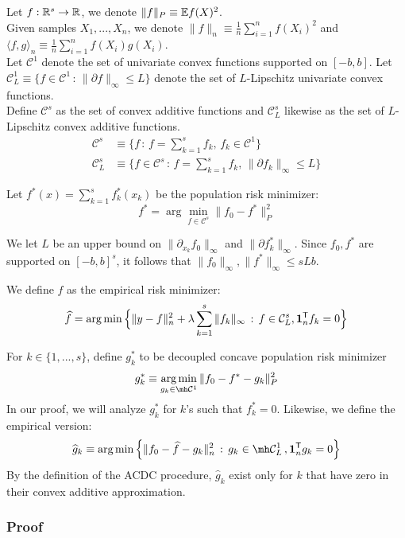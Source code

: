 Let $f : \mathbb{R}^s \rightarrow {\mathbb R}$, we denote $\| f \|_P \equiv {\mathbb E} f(X)^2$. \\
Given samples $X_1,...,X_n$, we denote $\| f \|_n \equiv \frac{1}{n} \sum_{i=1}^n f(X_i)^2$ and $\langle f, g \rangle_n \equiv \frac{1}{n} \sum_{i=1}^n f(X_i) g(X_i)$. \\

Let $\mathcal{C}^1$ denote the set of univariate convex functions supported on $[-b,b]$. Let $\mathcal{C}^1_L \equiv \{ f \in \mathcal{C}^1 \,:\, \| \partial f \|_\infty \leq L \}$ denote the set of $L$-Lipschitz univariate convex functions. \\

Define $\mathcal{C}^s$ as the set of convex additive functions and $\mathcal{C}^s_L$ likewise as the set of $L$-Lipschitz convex additive functions.
\begin{align*}
\mathcal{C}^s &\equiv \{ f \,:\, f = \sum_{k=1}^s f_k, \,
   f_k \in \mathcal{C}^1 \} \\
\mathcal{C}^s_L &\equiv \{ f \in \mathcal{C}^s \,:\, 
f = \sum_{k=1}^s f_k, \, \| \partial f_k \|_\infty \leq L \}
\end{align*}

Let $f^*(x) = \sum_{k=1}^s f^*_k(x_k)$ be the population risk minimizer:
\[
f^* = \arg\min_{f \in \mathcal{C}^s} \| f_0 - f^* \|_P^2
\]

We let $L$ be an upper bound on $\| \partial_{x_k} f_0 \|_\infty$ and $\| \partial f^*_k \|_\infty$. Since $f_0, f^*$ are supported on $[-b, b]^s$, it follows that $\| f_0 \|_\infty, \|f^* \|_\infty \leq s L b$.

We define $\hat{f}$ as the empirical risk minimizer:
\[
\widehat{f} = \arg\min \Big \{ \| y - f \|_n^2 + \lambda \sum_{k=1}^s \| f_k \|_\infty 
    \,:\, f \in \mathcal{C}^s_L, \mbox{\boldmath $1$}_n^{\mathsf{T}} f_k = 0 \Big \}
\]

For $k \in \{1,...,s\}$, define $g^*_k$ to be decoupled concave population risk minimizer
\[
g^*_k \equiv \argmin_{g_k \in \mh \mathcal{C}^1} \| f_0 - f^* - g_k \|_P^2 
\]
In our proof, we will analyze $g^*_k$ for $k$'s such that $f^*_k = 0$. Likewise, we define the empirical version:
\[
\hat{g}_k \equiv \argmin \Big\{ \| f_0 - \hat{f} - g_k \|_n^2 \,:\, g_k \in \mh \mathcal{C}^1_L \,, \mathbf{1}_n^\tran g_k = 0 \Big\}
\]
By the definition of the ACDC procedure, $\hat{g}_k$ exist only for $k$ that have zero in their convex additive approximation.


\subsubsection{Proof}
 

